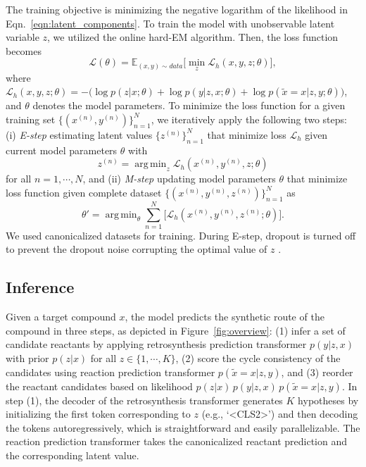 \documentclass[journal=jacsat,manuscript=article]{achemso}
\DeclareMathOperator*{\argmin}{arg\,min}
\begin{document}
	The training objective is minimizing the negative logarithm of the likelihood in Eqn.~\ref{eqn:latent_components}. To train the model with unobservable latent variable $z$, we utilized the online hard-EM algorithm. Then, the loss function becomes 
	\begin{equation}
	\mathcal{L}(\theta) = \mathbb{E}_{(x,y) \sim data} \big[ \min_{z} \mathcal{L}_h(x,y,z;\theta) \big],
	\end{equation}
	where $\mathcal{L}_h(x,y,z;\theta) = -\big( \log p(z|x;\theta) + \log p(y|z,x;\theta) + \log p(\tilde{x}=x|z,y;\theta) \big)$, and $\theta$ denotes the model parameters. To minimize the loss function for a given training set $\{(x^{(n)}, y^{(n)})\}_{n=1}^{N}$, we iteratively apply the following two steps: (i) \textit{E-step} estimating latent values $\{z^{(n)}\}_{n=1}^{N}$ that minimize loss $\mathcal{L}_h$ given current model parameters $\theta$ with 
	\begin{equation}
	z^{(n)} = \argmin_z \mathcal{L}_h (x^{(n)},y^{(n)},z;\theta)
	\end{equation}
	for all $n=1,\cdots,N$, and (ii) \textit{M-step} updating model parameters $\theta$ that minimize loss function given complete dataset $\{(x^{(n)}, y^{(n)}, z^{(n)})\}_{n=1}^{N}$ as 
	\begin{equation}
	\theta' = \argmin_\theta \sum_{n=1}^{N} \big[  \mathcal{L}_h(x^{(n)},y^{(n)},z^{(n)};\theta) \big].
	\end{equation}
	We used canonicalized datasets for training. During E-step, dropout is turned off to prevent the dropout noise corrupting the optimal value of $z$ \cite{chen2019learning}.
	
	\subsection{Inference}

 
	Given a target compound $x$, the model predicts the synthetic route of the compound in three steps, as depicted in Figure~\ref{fig:overview}: (1) infer a set of candidate reactants by applying retrosynthesis prediction transformer $p(y|z,x)$ with prior $p(z|x)$ for all $z\in\{1,\cdots,K\}$, (2) score the cycle consistency of the candidates using reaction prediction transformer $p(\tilde{x}=x|z,y)$, and (3) reorder the reactant candidates based on likelihood $p(z|x)\,p(y|z,x)\,p(\tilde{x}=x|z,y)$. In step (1), the decoder of the retrosynthesis transformer generates $K$ hypotheses by initializing the first token corresponding to $z$ (e.g., `<CLS2>') and then decoding the tokens autoregressively, which is straightforward and easily parallelizable. The reaction prediction transformer takes the canonicalized reactant prediction and the corresponding latent value.
	
\end{document}
